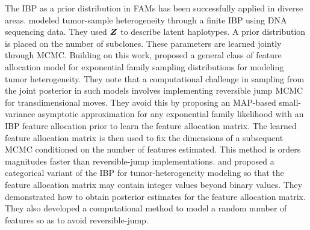 \documentclass[12pt,]{article}
\newcommand{\bZ}{\mbox{\boldmath $Z$}}
\begin{document}


The IBP as a prior distribution in FAMs has been successfully applied in
diverse areas. \cite{lee2015bayesian} modeled tumor-sample heterogeneity
through a finite IBP using DNA sequencing data.  They used $\bZ$ to describe
latent haplotypes. A prior distribution is placed on the number of subclones.
These parameters are learned jointly through MCMC.  Building on this work,
\cite{xu2015mad} proposed a general class of feature allocation model for
exponential family sampling distributions for modeling tumor heterogeneity.
They note that a computational challenge in sampling from the joint posterior
in such models involves implementing reversible jump MCMC
\citep{green1995reversible} for transdimensional moves. They avoid this by
proposing an MAP-based small-variance asymptotic approximation for any
exponential family likelihood with an IBP feature allocation prior to learn the
feature allocation matrix. The learned feature allocation matrix is then used
to fix the dimensions of a subsequent MCMC conditioned on the number of
features estimated. This method is orders magnitudes faster than
reversible-jump implementations.  \cite{sengupta2014bayclone} and
\cite{lee2016bayesian} proposed a categorical variant of the IBP for
tumor-heterogeneity modeling so that the feature allocation matrix may contain
integer values beyond binary values.  They demonstrated how to obtain posterior
estimates for the feature allocation matrix. They also developed a
computational method to model a random number of features so as to avoid
reversible-jump.

\end{document}
